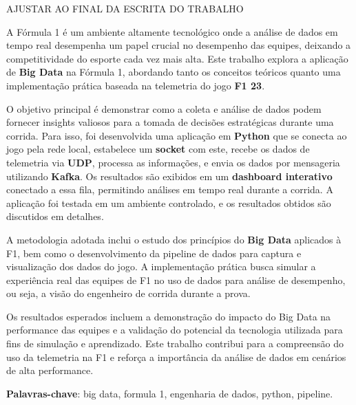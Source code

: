 \documentclass[12pt, %
openright, 
oneside, %
a4paper,    %
brazil]{facom-ufu-abntex2}
\begin{document}
\begin{resumo} %

  AJUSTAR AO FINAL DA ESCRITA DO TRABALHO

  A Fórmula 1 é um ambiente altamente tecnológico onde a análise de dados em 
  tempo real desempenha um papel crucial no desempenho das equipes, deixando a competitividade do esporte
  cada vez mais alta. Este trabalho explora a aplicação de \textbf{Big Data} na Fórmula 1, abordando tanto os conceitos teóricos 
  quanto uma implementação prática baseada na telemetria do jogo \textbf{F1 23}.
  
  O objetivo principal é demonstrar como a coleta e análise de dados podem fornecer insights valiosos para 
  a tomada de decisões estratégicas durante uma corrida. Para isso, foi desenvolvida uma aplicação em \textbf{Python} 
  que se conecta ao jogo pela rede local, estabelece um \textbf{socket} com este, recebe os dados de telemetria via \textbf{UDP}, 
  processa as informações, e envia os dados por mensageria utilizando \textbf{Kafka}. Os resultados são exibidos em um 
  \textbf{dashboard interativo} conectado a essa fila, permitindo análises em tempo real durante a corrida. 
  A aplicação foi testada em um ambiente controlado, e os resultados obtidos são discutidos em detalhes.
  
  A metodologia adotada inclui o estudo dos princípios do \textbf{Big Data} aplicados à F1, bem como o desenvolvimento 
  da pipeline de dados para captura e visualização dos dados do jogo. A implementação prática busca simular a experiência 
  real das equipes de F1 no uso de dados para análise de desempenho, ou seja, a visão do engenheiro de corrida durante a prova.

  Os resultados esperados incluem a demonstração do impacto do Big Data na performance das equipes e a 
  validação do potencial da tecnologia utilizada para fins de simulação e aprendizado. Este trabalho contribui 
  para a compreensão do uso da telemetria na F1 e reforça a importância da análise de dados em cenários de alta performance.

 \vspace{\onelineskip}
    
 \noindent
 \textbf{Palavras-chave}: big data, formula 1, engenharia de dados, python, pipeline. %
\end{resumo}

\listoffigures*
\cleardoublepage
\end{document}
